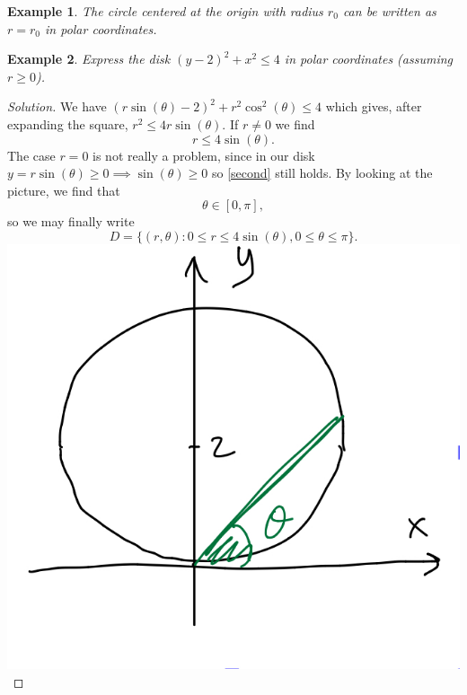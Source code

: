 \documentclass[12pt]{article}
\newenvironment{solution}
  {\begin{proof}[Solution]}
  {\end{proof}}
\newtheorem{example}{Example}
\begin{document}
\begin{example}The circle centered at the origin with radius $r_0$ can be written as $r=r_0$ in polar coordinates.
\end{example}
\begin{example} Express the disk $(y-2)^2+x^2\leq 4$ in polar coordinates (assuming $r\geq 0$). 
\end{example}
\begin{solution} We have $(r\sin(\theta)-2)^2+r^2\cos^2(\theta)\leq 4$ which gives, after expanding the square, $r^2\leq 4r\sin(\theta)$. If $r\neq 0$ we find \begin{equation}\label{second}r\leq 4\sin(\theta).\end{equation} The case $r=0$ is not really a problem, since in our disk $y=r\sin(\theta)\geq 0\implies \sin(\theta)\geq 0$ so  \eqref{second} still holds. By looking at the picture, we find that $$\theta\in[0,\pi],$$ so we may finally write $$D=\{(r,\theta):0\leq r\leq 4\sin(\theta),0\leq\theta\leq \pi\}.$$
\includegraphics[scale=.2]{disk.jpeg}
\end{solution}
\end{document}
